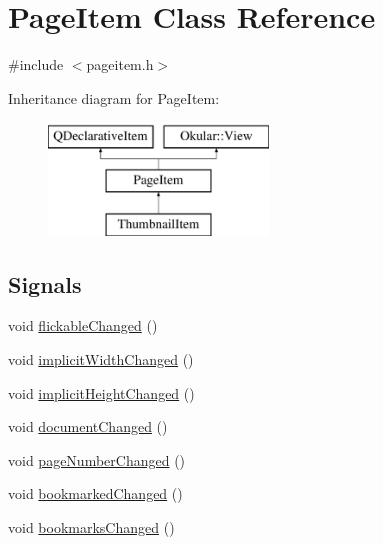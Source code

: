 \hypertarget{classPageItem}{\section{Page\+Item Class Reference}
\label{classPageItem}
}


{\ttfamily \#include $<$pageitem.\+h$>$}

Inheritance diagram for Page\+Item\+:\begin{figure}[H]
\begin{center}
\leavevmode
\includegraphics[height=3.000000cm]{classPageItem}
\end{center}
\end{figure}
\subsection*{Signals}
\begin{DoxyCompactItemize}
\item 
void \hyperlink{classPageItem_ab275cd815fb3d3c0d4f32fa09a91487e}{flickable\+Changed} ()
\item 
void \hyperlink{classPageItem_a8a673dbcae60409bf8980b18938a6dee}{implicit\+Width\+Changed} ()
\item 
void \hyperlink{classPageItem_ad588f5d4f3873895b782924107db3a05}{implicit\+Height\+Changed} ()
\item 
void \hyperlink{classPageItem_a7b4461238868477570d345a62ab2ed00}{document\+Changed} ()
\item 
void \hyperlink{classPageItem_a66a8385e48e35ac417fba56e88bf226b}{page\+Number\+Changed} ()
\item 
void \hyperlink{classPageItem_a9b5dfe52923d8c0550c6fe4094f730e1}{bookmarked\+Changed} ()
\item 
void \hyperlink{classPageItem_a95e60e4061e0a2a3284be8b5dbd8a68a}{bookmarks\+Changed} ()
\end{DoxyCompactItemize}
